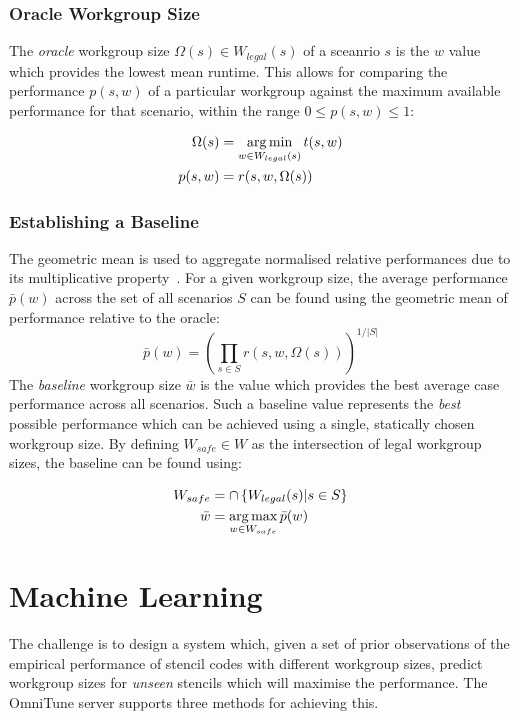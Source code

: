 \subsubsection{Oracle Workgroup Size}

The \emph{oracle} workgroup size $\Omega(s) \in W_{legal}(s)$ of a
sceanrio $s$ is the $w$ value which provides the lowest mean
runtime. This allows for comparing the performance $p(s,w)$ of a
particular workgroup against the maximum available performance for
that scenario, within the range $0 \le p(s,w) \le 1$:

\begin{align}
  \Omega(s) &= \operatorname*{arg\,min}_{w \in W_{legal}(s)} t(s,w)\\
  p(s,w) &= r(s, w, \Omega(s))
\end{align}


\subsubsection{Establishing a Baseline}

The geometric mean is used to aggregate normalised relative
performances due to its multiplicative
property~\cite{Fleming1986}. For a given workgroup size, the average
performance $\bar{p}(w)$ across the set of all scenarios $S$ can be
found using the geometric mean of performance relative to the oracle:
%
\begin{equation}
\bar{p}(w) =
\left(
  \prod_{s \in S} r(s, w, \Omega(s))
\right)^{1/|S|}
\end{equation}
%
The \emph{baseline} workgroup size $\bar{w}$ is the value which
provides the best average case performance across all scenarios. Such
a baseline value represents the \emph{best} possible performance which
can be achieved using a single, statically chosen workgroup size. By
defining $W_{safe} \in W$ as the intersection of legal workgroup
sizes, the baseline can be found using:

\begin{align}
W_{safe} &= \cap \left\{ W_{legal}(s) | s \in S \right\}\\
\bar{w} &= \operatorname*{arg\,max}_{w \in W_{safe}} \bar{p}(w)
\end{align}


\section{Machine Learning}

The challenge is to design a system which, given a set of prior
observations of the empirical performance of stencil codes with
different workgroup sizes, predict workgroup sizes for \emph{unseen}
stencils which will maximise the performance. The OmniTune server
supports three methods for achieving this.


